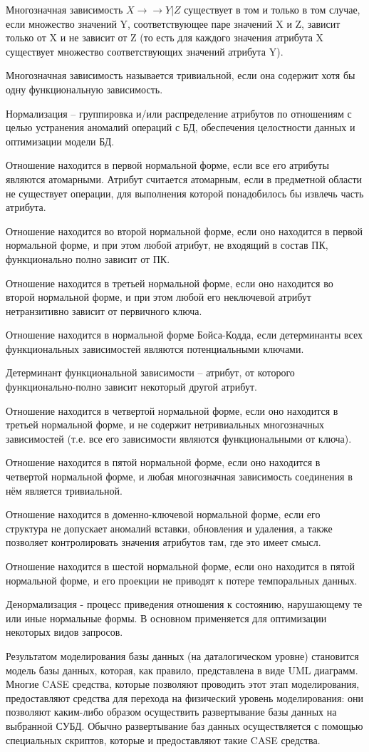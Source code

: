 Многозначная зависимость $X \rightarrow\rightarrow Y | Z$ существует в том и только в том случае, если множество значений Y, соответствующее паре значений X и Z, зависит только от X и не зависит от Z (то есть для каждого значения атрибута X существует множество соответствующих значений атрибута Y).

Многозначная зависимость называется тривиальной, если она содержит хотя бы одну функциональную зависимость.

Нормализация -- группировка и/или распределение атрибутов по отношениям с целью устранения аномалий операций с БД, обеспечения целостности данных и оптимизации модели БД.

Отношение находится в первой нормальной форме, если все его атрибуты являются атомарными. Атрибут считается атомарным, если в предметной области не существует операции, для выполнения которой понадобилось бы извлечь часть атрибута.

Отношение находится во второй нормальной форме, если оно находится в первой нормальной форме, и при этом  любой атрибут, не входящий в состав ПК, функционально полно зависит от ПК.

Отношение находится в третьей нормальной форме, если оно находится во второй нормальной форме, и при этом любой его неключевой атрибут нетранзитивно зависит от первичного ключа.

Отношение находится в нормальной форме Бойса-Кодда, если детерминанты всех функциональных зависимостей являются потенциальными ключами.

Детерминант функциональной зависимости -- атрибут, от которого функционально-полно зависит некоторый другой атрибут.

Отношение находится в четвертой нормальной форме, если оно находится в третьей нормальной форме, и не содержит нетривиальных многозначных зависимостей (т.е. все его зависимости являются функциональными от ключа).

Отношение находится в пятой нормальной форме, если оно находится в четвертой нормальной форме, и любая многозначная зависимость соединения в нём является тривиальной.

Отношение находится в доменно-ключевой нормальной форме, если его структура не допускает аномалий вставки, обновления и удаления, а также позволяет контролировать значения атрибутов там, где это имеет смысл.

Отношение находится в шестой нормальной форме, если оно находится в пятой нормальной форме, и его проекции не приводят к потере темпоральных данных.

Денормализация - процесс приведения отношения к состоянию, нарушающему те или иные нормальные формы. В основном применяется для оптимизации некоторых видов запросов.

Результатом моделирования базы данных (на даталогическом уровне) становится модель базы данных, которая, как правило, представлена в виде UML диаграмм. Многие CASE средства, которые позволяют проводить этот этап моделирования, предоставляют средства для перехода на физический уровень моделирования: они позволяют каким-либо образом осуществить развертывание базы данных на выбранной СУБД. Обычно развертывание баз данных осуществляется с помощью специальных скриптов, которые и предоставляют такие CASE средства.
